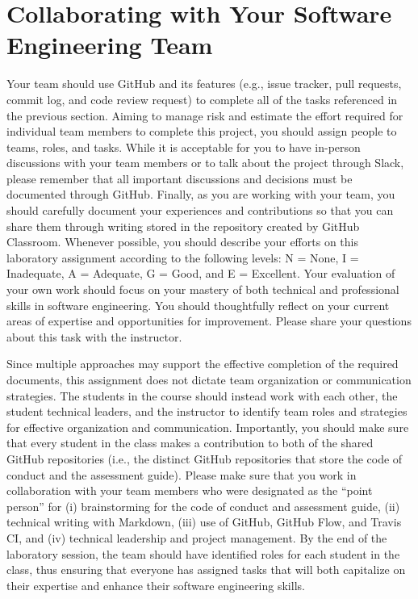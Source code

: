 \documentclass[11pt]{article}
\begin{document}
\section*{Collaborating with Your Software Engineering Team}

Your team should use GitHub and its features (e.g., issue tracker, pull
requests, commit log, and code review request) to complete all of the tasks
referenced in the previous section.
%
Aiming to manage risk and estimate the effort required for individual team
members to complete this project, you should assign people to teams, roles, and
tasks. While it is acceptable for you to have in-person discussions with your
team members or to talk about the project through Slack, please remember that
all important discussions and decisions must be documented through GitHub.
Finally, as you are working with your team, you should carefully document your
experiences and contributions so that you can share them through writing stored
in the repository created by GitHub Classroom.
%
Whenever possible, you should describe your efforts on this laboratory
assignment according to the following levels: N = None, I = Inadequate, A =
Adequate, G = Good, and E = Excellent. Your evaluation of your own work should
focus on your mastery of both technical and professional skills in software
engineering. You should thoughtfully reflect on your current areas of expertise
and opportunities for improvement. Please share your questions about this task
with the instructor.

Since multiple approaches may support the effective completion of the required
documents, this assignment does not dictate team organization or communication
strategies. The students in the course should instead work with each other, the
student technical leaders, and the instructor to identify team roles and
strategies for effective organization and communication. Importantly, you
should make sure that every student in the class makes a contribution to both
of the shared GitHub repositories (i.e., the distinct GitHub repositories that
store the code of conduct and the assessment guide).
%
Please make sure that you work in collaboration with your team members who were
designated as the ``point person'' for (i) brainstorming for the code of
conduct and assessment guide, (ii) technical writing with Markdown, (iii) use
of GitHub, GitHub Flow, and Travis CI, and (iv) technical leadership and
project management.
%
By the end of the laboratory session, the team should have identified roles for
each student in the class, thus ensuring that everyone has assigned tasks that
will both capitalize on their expertise and enhance their software engineering
skills.
\end{document}
